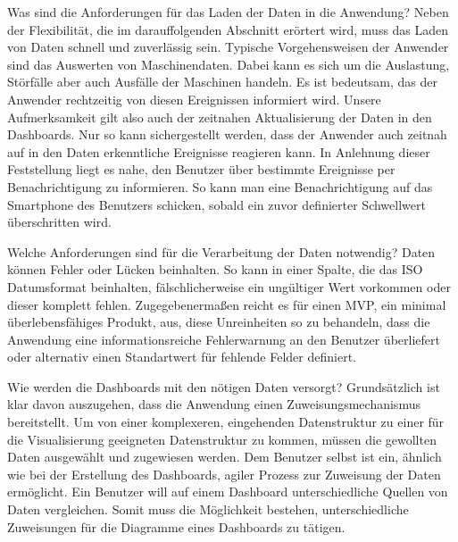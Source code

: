 Was sind die Anforderungen für das Laden der Daten in die Anwendung? Neben der Flexibilität,
die im darauffolgenden Abschnitt erörtert wird, muss das Laden von Daten schnell und zuverlässig
sein. Typische Vorgehensweisen der Anwender sind das Auswerten von Maschinendaten. Dabei kann es
sich um die Auslastung, Störfälle aber auch Ausfälle der Maschinen handeln. Es ist bedeutsam,
das der Anwender rechtzeitig von diesen Ereignissen informiert wird. Unsere
Aufmerksamkeit gilt also auch der zeitnahen Aktualisierung der Daten in den Dashboards. Nur
so kann sichergestellt werden, dass der Anwender auch zeitnah auf in den Daten erkenntliche
Ereignisse reagieren kann. In Anlehnung dieser Feststellung liegt es nahe, den Benutzer
über bestimmte Ereignisse per Benachrichtigung zu informieren. So kann man
eine Benachrichtigung auf das Smartphone des Benutzers schicken, sobald ein zuvor definierter
Schwellwert überschritten wird.

Welche Anforderungen sind für die Verarbeitung der Daten notwendig? Daten können Fehler oder Lücken
beinhalten. So kann in einer Spalte, die das ISO Datumsformat beinhalten, fälschlicherweise ein
ungültiger Wert vorkommen oder dieser komplett fehlen. Zugegebenermaßen reicht es für einen MVP, ein
minimal überlebensfähiges Produkt, aus, diese Unreinheiten so zu behandeln, dass die Anwendung
eine informationsreiche Fehlerwarnung an den Benutzer überliefert oder alternativ einen Standartwert
für fehlende Felder definiert.

Wie werden die Dashboards mit den nötigen Daten versorgt? Grundsätzlich ist klar davon auszugehen,
dass die Anwendung einen Zuweisungsmechanismus bereitstellt. Um von einer komplexeren, eingehenden
Datenstruktur zu einer für die Visualisierung geeigneten Datenstruktur zu kommen, müssen die gewollten
Daten ausgewählt und zugewiesen werden. Dem Benutzer selbst ist ein, ähnlich wie bei der Erstellung
des Dashboards, agiler Prozess zur Zuweisung der Daten ermöglicht. Ein Benutzer will auf einem
Dashboard unterschiedliche Quellen von Daten vergleichen. Somit muss die Möglichkeit bestehen,
unterschiedliche Zuweisungen für die Diagramme eines Dashboards zu tätigen.

